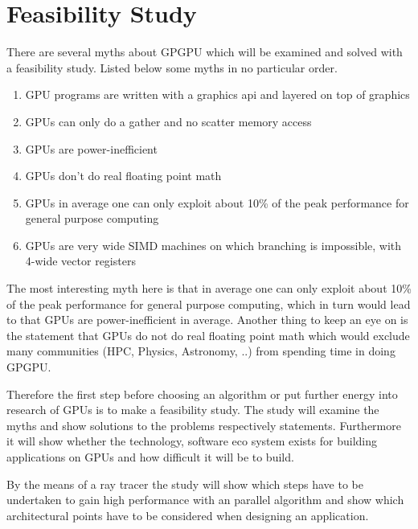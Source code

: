 \chapter{Feasibility Study}
\label{chap:feas}
There are several myths about \gls{GPGPU} which will be examined and solved 
with a feasibility study. Listed below some myths in no particular order.
\begin{enumerate}
	\item \gls{GPU} programs are written with a graphics api and layered on top 
		of graphics
	\label{enum:api}
	\item \glspl{GPU} can only do a gather and no scatter memory access
	\label{enum:gather}
	\item \glspl{GPU} are power-inefficient
	\label{enum:ineff}
	\item \glspl{GPU} don't do real floating point math
	\label{enum:float}
	\item \glspl{GPU} in average one can only exploit about 10\% of the peak 
		performance for general purpose computing
	\label{enum:exploit}
	\item \glspl{GPU} are very wide \gls{SIMD} machines on which branching is 	  
		impossible, with 4-wide vector registers
 	\label{enum:simd}
\end{enumerate}

The most interesting myth here is that in average one can only exploit about
10\% of the peak performance for general purpose computing, which in turn would 
lead to that \glspl{GPU} are power-inefficient in average. Another thing to 
keep an eye on is the statement that \glspl{GPU} do not do real floating point
math which would exclude many communities (\gls{HPC}, Physics, Astronomy, ..)
 from spending time in doing \gls{GPGPU}. 

Therefore the first step before choosing an algorithm or put further energy into
research of \glspl{GPU} is to make a feasibility study. The study will examine
the myths and show solutions to the problems respectively statements.
Furthermore it will show whether the technology, software eco system exists for
building applications on \glspl{GPU} and how difficult it will be to build.

By the means of a ray tracer the study will show which steps have to be 
undertaken to gain high performance with an parallel algorithm and show which 
architectural points have to be considered when designing an application.

